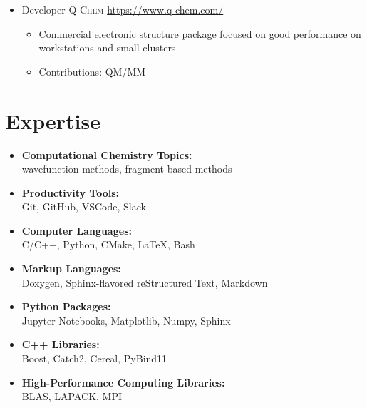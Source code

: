 \documentclass[11pt,a4paper,sans]{moderncv}
\begin{document}
\begin{itemize}
{{\begin{itemize}
			\item{Contributions: SCF, infrastructure, many-body expansion}
		  \end{itemize}
	  	}
  	}
	\item{
		{Developer}
		{\textsc{Q-Chem}}
		{\url{https://www.q-chem.com/}}
		{}
		{\begin{itemize}
		 	\item{Commercial electronic structure package focused on good
		  			  performance on workstations and small clusters.}
		 	\item{Contributions: QM/MM}
		  \end{itemize}
	  }
	}
\end{itemize}

\section{Expertise}
\begin{itemize}
	\item{\textbf{Computational Chemistry Topics:}\\
		  wavefunction methods, fragment-based methods}
	\item{\textbf{Productivity Tools:}\\
		 Git, GitHub, VSCode, Slack}
	\item{\textbf{Computer Languages:}\\
		  C/C++, Python, CMake, \LaTeX, Bash}
	\item{\textbf{Markup Languages:}\\
		 Doxygen, Sphinx-flavored reStructured Text, Markdown}
	\item{\textbf{Python Packages:}\\
		 Jupyter Notebooks, Matplotlib, Numpy, Sphinx}
	\item{\textbf{C++ Libraries:}\\
		 Boost, Catch2, Cereal, PyBind11}
	\item{\textbf{High-Performance Computing Libraries:}\\
		 BLAS, LAPACK, MPI}
\end{itemize}
\end{document}
